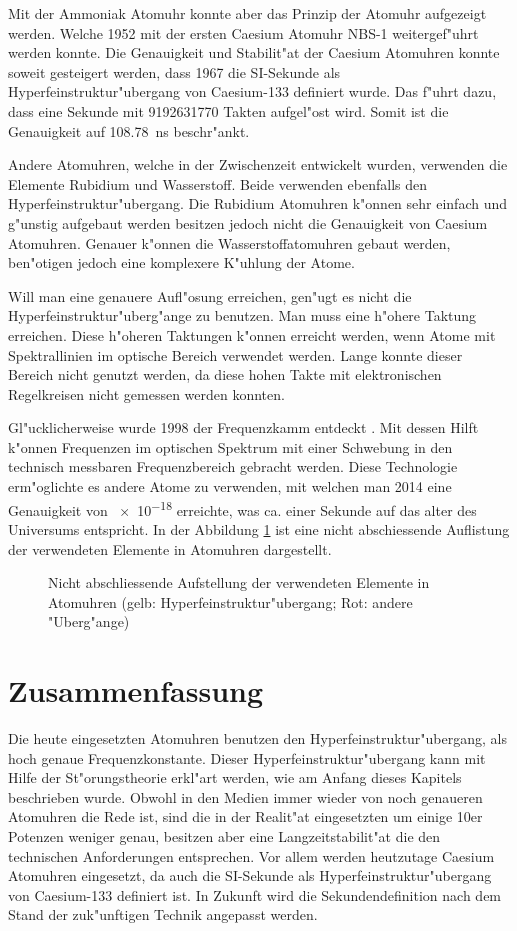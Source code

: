 \begin{refsection}
Mit der Ammoniak Atomuhr konnte aber das Prinzip der Atomuhr
aufgezeigt werden.  Welche 1952 mit der ersten Caesium Atomuhr NBS-1
weitergef"uhrt werden konnte.  Die Genauigkeit und Stabilit"at der
Caesium Atomuhren konnte soweit gesteigert werden, dass 1967 die
SI-Sekunde als Hyperfeinstruktur"ubergang von Caesium-133 definiert
wurde.  Das f"uhrt dazu, dass eine Sekunde mit \num{9192631770} Takten
aufgel"ost wird.  Somit ist die Genauigkeit auf
\SI{108.78}{\nano\second} beschr"ankt.

Andere Atomuhren, welche in der Zwischenzeit entwickelt wurden,
verwenden die Elemente Rubidium und Wasserstoff.  Beide verwenden
ebenfalls den Hyperfeinstruktur"ubergang.  Die Rubidium Atomuhren
k"onnen sehr einfach und g"unstig aufgebaut werden besitzen jedoch
nicht die Genauigkeit von Caesium Atomuhren.  Genauer k"onnen die
Wasserstoffatomuhren gebaut werden, ben"otigen jedoch eine komplexere
K"uhlung der Atome.

Will man eine genauere Aufl"osung erreichen, gen"ugt es nicht die
Hyperfeinstruktur"uberg"ange zu benutzen.  Man muss eine h"ohere
Taktung erreichen.  Diese h"oheren Taktungen k"onnen erreicht werden,
wenn Atome mit Spektrallinien im optische Bereich verwendet werden.
Lange konnte dieser Bereich nicht genutzt werden, da diese hohen
Takte mit elektronischen Regelkreisen nicht gemessen werden konnten.

Gl"ucklicherweise wurde 1998 der Frequenzkamm entdeckt
\cite{SdW:kamm}.  Mit dessen Hilft k"onnen Frequenzen im optischen
Spektrum mit einer Schwebung in den technisch messbaren
Frequenzbereich gebracht werden.  Diese Technologie erm"oglichte es
andere Atome zu verwenden, mit welchen man 2014 eine Genauigkeit von
\num{e-18} erreichte, was ca. einer Sekunde auf das alter des
Universums entspricht.  In der Abbildung \ref{fig:periode} ist eine
nicht abschiessende Auflistung der verwendeten Elemente in Atomuhren
dargestellt.

\begin{figure}
  \centering
  
  \caption{Nicht abschliessende Aufstellung der verwendeten Elemente
    in Atomuhren (gelb: Hyperfeinstruktur"ubergang; Rot: andere
    "Uberg"ange)}
  \label{fig:periode}
\end{figure}

\section{Zusammenfassung}
Die heute eingesetzten Atomuhren benutzen den
Hyperfeinstruktur"ubergang, als hoch genaue Frequenzkonstante.  Dieser
Hyperfeinstruktur"ubergang kann mit Hilfe der St"orungstheorie
erkl"art werden, wie am Anfang dieses Kapitels beschrieben wurde.
Obwohl in den Medien immer wieder von noch genaueren Atomuhren die
Rede ist, sind die in der Realit"at eingesetzten um einige 10er
Potenzen weniger genau, besitzen aber eine Langzeitstabilit"at die den
technischen Anforderungen entsprechen.  Vor allem werden heutzutage
Caesium Atomuhren eingesetzt, da auch die SI-Sekunde als
Hyperfeinstruktur"ubergang von Caesium-133 definiert ist.  In Zukunft
wird die Sekundendefinition nach dem Stand der zuk"unftigen Technik
angepasst werden.

\printbibliography[heading=subbibliography]
\end{refsection}

